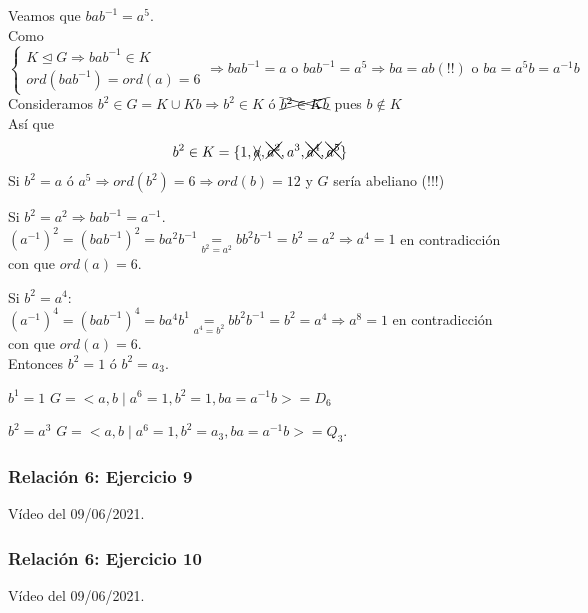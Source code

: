 \documentclass[11pt,a4paper]{article}
\begin{document}
\begin{enumerate}[label = (\arabic*)]
\begin{enumerate*}
\begin{enumerate*}
Veamos que $bab^{-1} = a^{5}$. \\
Como $\begin{cases}
K \unlhd G \Rightarrow bab^{-1} \in K \\
ord(bab^{-1}) = ord(a) = 6
\end{cases} \Rightarrow bab^{-1} = a \text{ o } bab^{-1} = a^{5} \Rightarrow ba = ab (!!) \text{ o } ba = a^{5}b = a^{-1}b$ \\
Consideramos $b^{2} \in G = K \cup Kb \Rightarrow b^{2} \in K$ ó $\xcancel{b^{2} \in Kb}$ pues $b \notin K$ \\
Así que
$$b^{2} \in K = \{1, \xcancel{a}, \xcancel{a^{2}}, a^{3}, \xcancel{a^{4}}, \xcancel{a^{5}}\}$$
Si $b^{2} = a$ ó $a^{5} \Rightarrow ord(b^{2}) = 6 \Rightarrow ord(b) = 12$ y $G$ sería abeliano (!!!)

Si $b^{2} = a^{2} \Rightarrow bab^{-1} = a^{-1}$. \\
$(a^{-1})^{2} = (bab^{-1})^{2} = ba^{2}b^{-1} \underset{b^{2} = a^{2}}{=} bb^{2}b^{-1} = b^{2} = a^{2} \Rightarrow a^{4} = 1$ en contradicción con que $ord(a) = 6$.

Si $b^{2} = a^{4}:$ \\
$(a^{-1})^{4} = (bab^{-1})^{4} = ba^{4}b^{1} \underset{a^{4} = b^{2}}{=} bb^{2}b^{-1} = b^{2} = a^{4} \Rightarrow a^{8} = 1$ en contradicción con que $ord(a) = 6$. \\
Entonces $b^{2} = 1$ ó $b^{2} = a_{3}$.
\begin{enumerate*}
\item[$b^{1} = 1$] $G = <a, b \mid a^{6} = 1, b^{2} = 1, ba = a^{-1}b> = D_{6}$
\item[$b^{2} = a^{3}$] $G = <a, b \mid a^{6} = 1, b^{2} = a_{3}, ba = a^{-1}b> = Q_{3}$.
\end{enumerate*}
\end{enumerate*}
\end{enumerate*}
\end{enumerate}

\subsubsection*{Relación 6: Ejercicio 9}

Vídeo del 09/06/2021.

\subsubsection*{Relación 6: Ejercicio 10}

Vídeo del 09/06/2021.
\end{document}

